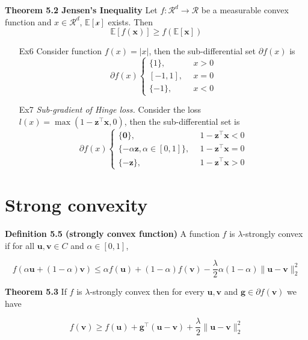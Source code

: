 \documentclass{article}
\begin{document}
	\textbf{Theorem 5.2 Jensen's Inequality} Let $f: \mathcal{R}^d \rightarrow \mathcal{R}$ be a measurable convex function and $x \in \mathcal{R}^d$, $\mathbb{E}[\mathcal{x}]$ exists. Then
	$$\mathbb{E}[f(\mathbf{x})] \geq f(\mathbb{E}[\mathbf{x}]) $$
	
	\begin{itemize}
	\item[Ex6] Consider function $f(x)=|x|$, then the sub-differential set $\partial f(x)$ is 
	\begin{equation*}
	\partial f(x) \left\{
	\begin{aligned}
	\{1\}, &\ \ x>0 \\
	[-1, 1], &\ \ x=0 \\
	\{-1\}, &\ \ x<0
	\end{aligned}\right.
	\end{equation*}
	\item[Ex7] \textit{Sub-gradient of Hinge loss.} Consider the loss $l(x)=\max(1-\mathbf{z}^\top \mathbf{x}, 0)$, then the sub-differential set is \begin{equation*}
	\partial f(x) \left\{
	\begin{aligned}
	\{\mathbf{0}\}, &\ \  1-\mathbf{z}^\top \mathbf{x}<0\\
	\{-\alpha\mathbf{z}, \alpha\in[0, 1]\}, &\ \ 1-\mathbf{z}^\top \mathbf{x}=0\\
	\{-\mathbf{z}\}, &\ \ 1-\mathbf{z}^\top \mathbf{x}>0
	\end{aligned}\right.
	\end{equation*}
	\end{itemize}
	
\section{Strong convexity}

	\textbf{Definition 5.5 (strongly convex function)} A function $f$ is $\lambda$-strongly convex if for all $\mathbf{u}, \mathbf{v}\in C$ and $\alpha\in[0,1]$,
	
	$$f(\alpha \mathbf{u} + (1-\alpha) \mathbf{v}) \leq \alpha f(\mathbf{u}) + (1-\alpha) f(\mathbf{v}) - \frac{\lambda}{2} \alpha (1-\alpha) \|\mathbf{u}-\mathbf{v}\|^2_2$$
	
	\textbf{Theorem 5.3} If $f$ is $\lambda$-strongly convex then for every $\mathbf{u}, \mathbf{v}$ and $\mathbf{g} \in \partial f(\mathbf{v})$ we have
	
	$$f(\mathbf{v})\geq f(\mathbf{u}) + \mathbf{g}^\top (\mathbf{u}-\mathbf{v})+\frac{\lambda}{2}\|\mathbf{u}-\mathbf{v}\|^2_2$$
\end{document}
